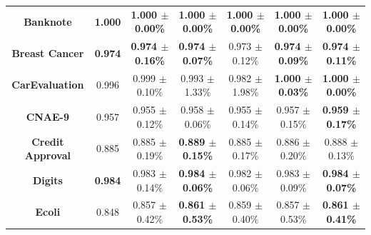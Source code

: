 \documentclass[preprint,12pt]{elsarticle}
\begin{document}
\begin{table}
{\begin{tabular}{ccccccc}
\textbf{Banknote}               & {\color[HTML]{FE0000} \textbf{1.000}} & {\color[HTML]{FE0000} \textbf{1.000 $\pm$ 0.00\%}} & {\color[HTML]{FE0000} \textbf{1.000 $\pm$ 0.00\%}} & {\color[HTML]{FE0000} \textbf{1.000 $\pm$ 0.00\%}} & {\color[HTML]{FE0000} \textbf{1.000 $\pm$ 0.00\%}} & {\color[HTML]{FE0000} \textbf{1.000 $\pm$ 0.00\%}} \\
\textbf{Breast Cancer}          & {\color[HTML]{FE0000} \textbf{0.974}} & \textbf{0.974 $\pm$ 0.16\%}                        & \textbf{0.974 $\pm$ 0.07\%}                        & 0.973 $\pm$ 0.12\%                                 & \textbf{0.974 $\pm$ 0.09\%}                        & \textbf{0.974 $\pm$ 0.11\%}                        \\
\textbf{CarEvaluation}          & 0.996                                 & 0.999 $\pm$ 0.10\%                                 & 0.993 $\pm$ 1.33\%                                 & 0.982 $\pm$ 1.98\%                                 & \textbf{1.000 $\pm$ 0.03\%}                        & {\color[HTML]{FE0000} \textbf{1.000 $\pm$ 0.00\%}} \\
\textbf{CNAE-9}                 & 0.957                                 & 0.955 $\pm$ 0.12\%                                 & 0.958 $\pm$ 0.06\%                                 & 0.955 $\pm$ 0.14\%                                 & 0.957 $\pm$ 0.15\%                                 & {\color[HTML]{FE0000} \textbf{0.959 $\pm$ 0.17\%}} \\
\textbf{Credit   Approval}      & 0.885                                 & 0.885 $\pm$ 0.19\%                                 & {\color[HTML]{FE0000} \textbf{0.889 $\pm$ 0.15\%}} & 0.885 $\pm$ 0.17\%                                 & 0.886 $\pm$ 0.20\%                                 & 0.888 $\pm$ 0.13\%                                 \\
\textbf{Digits}                 & {\color[HTML]{FE0000} \textbf{0.984}} & 0.983 $\pm$ 0.14\%                                 & \textbf{0.984 $\pm$ 0.06\%}                        & 0.982 $\pm$ 0.06\%                                 & 0.983 $\pm$ 0.09\%                                 & \textbf{0.984 $\pm$ 0.07\%}                        \\
\textbf{Ecoli}                  & 0.848                                 & 0.857 $\pm$ 0.42\%                                 & \textbf{0.861 $\pm$ 0.53\%}                        & 0.859 $\pm$ 0.40\%                                 & 0.857 $\pm$ 0.53\%                                 & {\color[HTML]{FE0000} \textbf{0.861 $\pm$ 0.41\%}} \\

\end{tabular}}
\end{table}
\end{document}
